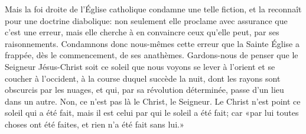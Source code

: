 Mais la foi droite de l’Église catholique condamne une telle fiction,
	et la reconnaît pour une doctrine diabolique:
	non seulement elle proclame avec assurance que c’est une erreur,
	mais elle cherche à en convaincre ceux qu’elle peut, par ses raisonnements.
Condamnons donc nous-mêmes cette erreur
	que la Sainte Église a frappée, dès le commencement, de ses anathèmes.
	Gardons-nous de penser que le Seigneur Jésus-Christ soit ce soleil
		que nous voyons se lever à l’orient et se coucher à l’occident,
	à la course duquel succède la nuit,
	dont les rayons sont obscurcis par les nuages,
	et qui, par sa révolution déterminée, passe d’un lieu dans un autre.
Non, ce n’est pas là le Christ, le Seigneur.
Le Christ n’est point ce soleil qui a été fait,
	mais il est celui par qui le soleil a été fait;
	car «par lui toutes choses ont été faites, et rien n’a été fait sans lui.»
